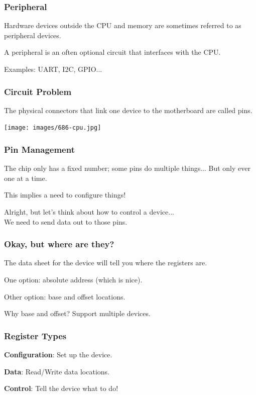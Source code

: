 \begin{frame}
\frametitle{Peripheral}

Hardware devices outside the CPU and memory are sometimes referred to as peripheral devices.

A peripheral is an often optional circuit that interfaces with the CPU.

Examples: UART, I2C, GPIO...

\end{frame}


\begin{frame}
\frametitle{Circuit Problem}

The physical connectors that link one device to the motherboard are called pins.

\begin{center}
	\texttt{[image: images/686-cpu.jpg]}
\end{center}


\end{frame}


\begin{frame}
\frametitle{Pin Management}

The chip only has a fixed number; some pins do multiple things...
\quad But only ever one at a time.

This implies a need to configure things!

Alright, but let's think about how to control a device...\\
\quad We need to send data out to those pins.

\end{frame}


\begin{frame}
\frametitle{Okay, but where are they?}

The data sheet for the device will tell you where the registers are.

One option: absolute address (which is nice).

Other option: base and offset locations.

Why base and offset? Support multiple devices.


\end{frame}


\begin{frame}
\frametitle{Register Types}

\textbf{Configuration}: Set up the device.

\textbf{Data}: Read/Write data locations.

\textbf{Control}: Tell the device what to do!

\end{frame}


